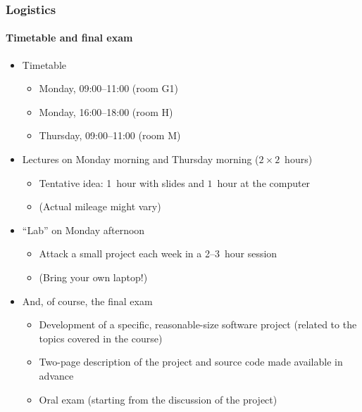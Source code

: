 \documentclass[9pt]{beamer}
\begin{document}
\begin{frame}
  \frametitle{Logistics}
  \framesubtitle{Timetable and final exam}
  \begin{itemize}
  \item Timetable
    \begin{itemize}
    \item Monday, 09:00--11:00 (room G1)
    \item Monday, 16:00--18:00 (room H)
    \item Thursday, 09:00--11:00 (room M)
    \end{itemize}
  \item Lectures on Monday morning and Thursday morning ($2 \times 2$~hours)
    \begin{itemize}
    \item Tentative idea: 1~hour with slides and $1$~hour at the computer
    \item (Actual mileage might vary)
    \end{itemize}
  \item ``Lab'' on Monday afternoon
    \begin{itemize}
    \item Attack a small project each week in a 2--3~hour session
    \item (Bring your own laptop!)
    \end{itemize}
  \item \alert{And, of course, the final exam}
    \begin{itemize}
    \item Development of a specific, reasonable-size software project
      (related to the topics covered in the course)
    \item Two-page description of the project and source code made
      available in advance
    \item Oral exam (starting from the discussion of the project)
    \end{itemize}
  \end{itemize}
\end{frame}
\end{document}
